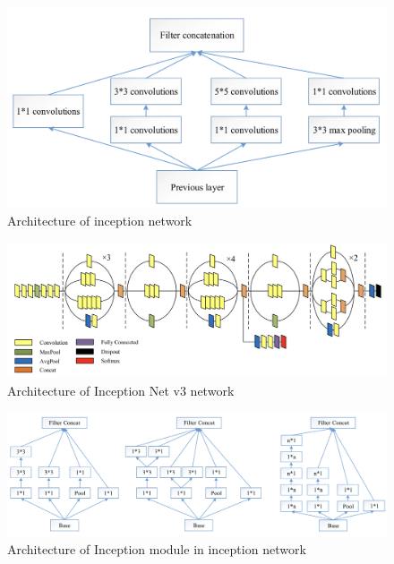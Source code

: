 \documentclass[12pt, a4paper,twoside]{report}
\theoremstyle{plain} %
\theoremstyle{definition} %
\theoremstyle{remark} %
\numberwithin{equation}{chapter}
\begin{document}
\begin{figure}[h]
    \centering
    \includegraphics[scale=0.5]{Inception_network.png}
    \caption{Architecture of inception network}
    \label{fig:inception_net}
\end{figure}

\begin{figure}[h]
    \centering
    \includegraphics[scale=0.4]{Inception v3.png}
    \caption{Architecture of Inception Net v3 network}
    \label{fig:inception_v3}
\end{figure}

\begin{figure}[h]
    \centering
    \includegraphics[scale=0.4]{Inception module.png}
    \caption{Architecture of Inception module in inception network}
    \label{fig:inception_mod}
\end{figure}
\end{document}
